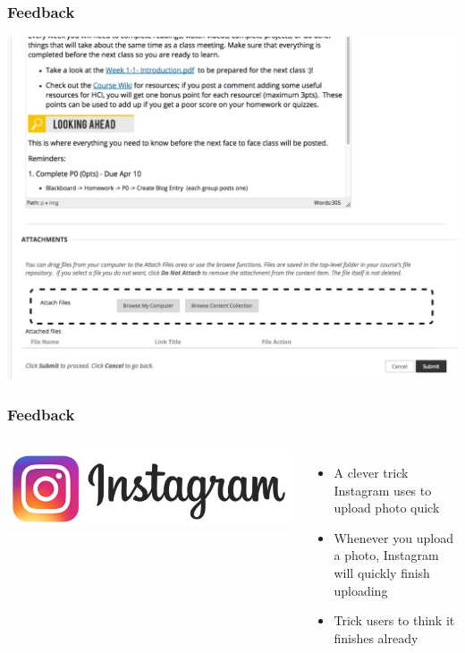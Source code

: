 \documentclass{beamer}
\begin{document}
\begin{frame}
\frametitle{Feedback}
\centering
\includegraphics[width=0.8\linewidth]{feedback}
\end{frame}


\begin{frame}
\frametitle{Feedback}

\begin{columns}[c] %
	
	\includegraphics[width=1\linewidth]{instagram}
	
	\begin{itemize}
		\item A clever trick Instagram uses to upload photo quick
		\item Whenever you upload a photo, Instagram will quickly finish uploading
		\item Trick users to think it finishes already
	\end{itemize}
\end{columns}
\end{frame}
\end{document}
